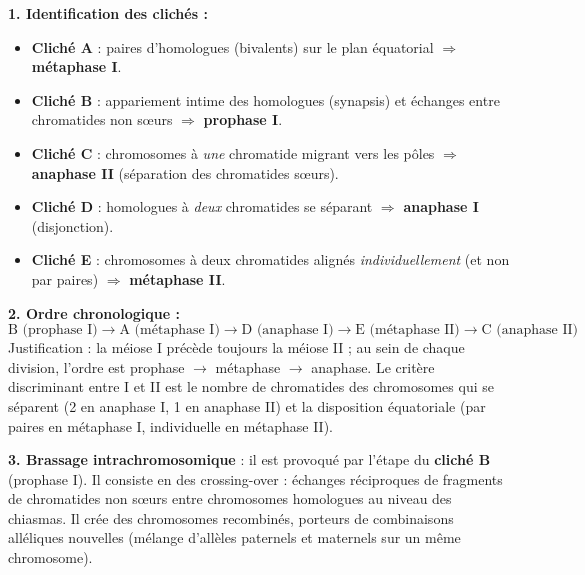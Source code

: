 \documentclass[11pt]{article}
\newcommand{\cle}[1]{{\popxbold\color{popdark}#1}}
\begin{document}
\begin{corrige}
\textbf{1. Identification des clichés :}
\begin{itemize}
\item \textbf{Cliché A} : paires d'homologues (bivalents) sur le plan équatorial $\Rightarrow$ \textbf{métaphase I}.
\item \textbf{Cliché B} : appariement intime des homologues (synapsis) et échanges entre chromatides non sœurs $\Rightarrow$ \textbf{prophase I}.
\item \textbf{Cliché C} : chromosomes à \emph{une} chromatide migrant vers les pôles $\Rightarrow$ \textbf{anaphase II} (séparation des chromatides sœurs).
\item \textbf{Cliché D} : homologues à \emph{deux} chromatides se séparant $\Rightarrow$ \textbf{anaphase I} (disjonction).
\item \textbf{Cliché E} : chromosomes à deux chromatides alignés \emph{individuellement} (et non par paires) $\Rightarrow$ \textbf{métaphase II}.
\end{itemize}

\textbf{2. Ordre chronologique :}
\[ \text{B (prophase I)} \rightarrow \text{A (métaphase I)} \rightarrow \text{D (anaphase I)} \rightarrow \text{E (métaphase II)} \rightarrow \text{C (anaphase II)} \]
Justification : la méiose I précède toujours la méiose II ; au sein de chaque division, l'ordre est prophase $\rightarrow$ métaphase $\rightarrow$ anaphase. Le critère discriminant entre I et II est le nombre de chromatides des chromosomes qui se séparent (2 en anaphase I, 1 en anaphase II) et la disposition équatoriale (par paires en métaphase I, individuelle en métaphase II).

\textbf{3. Brassage intrachromosomique} : il est provoqué par l'étape du \textbf{cliché B} (prophase I). Il consiste en des \cle{crossing-over} : échanges réciproques de fragments de chromatides non sœurs entre chromosomes homologues au niveau des chiasmas. Il crée des chromosomes recombinés, porteurs de combinaisons alléliques nouvelles (mélange d'allèles paternels et maternels sur un même chromosome).
\end{corrige}
\end{document}
